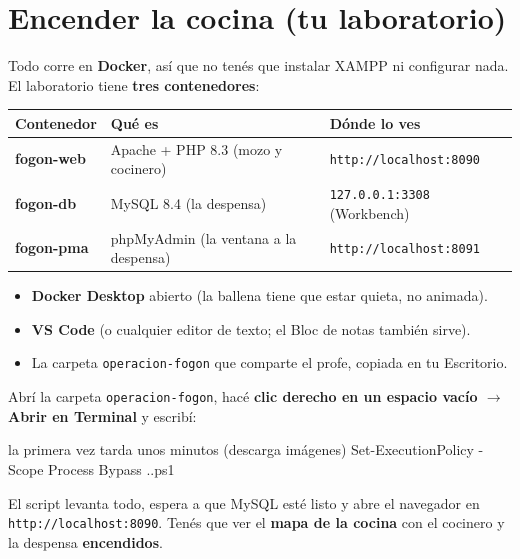 \clearpage
\renewcommand{\seccionactual}{ENCENDER LA COCINA}
\section*{Encender la cocina (tu laboratorio)}

Todo corre en \textbf{Docker}, así que no tenés que instalar XAMPP ni configurar nada.
El laboratorio tiene \textbf{tres contenedores}:

\renewcommand{\arraystretch}{1.3}
\begin{tabularx}{\linewidth}{>{\ttfamily\bfseries}l l X}
\toprule
\normalfont\bfseries Contenedor & \textbf{Qué es} & \textbf{Dónde lo ves} \\
\midrule
fogon-web & Apache + PHP 8.3 (mozo y cocinero) & \texttt{http://localhost:8090} \\
fogon-db  & MySQL 8.4 (la despensa) & \texttt{127.0.0.1:3308} (Workbench) \\
fogon-pma & phpMyAdmin (la ventana a la despensa) & \texttt{http://localhost:8091} \\
\bottomrule
\end{tabularx}

\begin{itemize}
  \item \textbf{Docker Desktop} abierto (la ballena tiene que estar quieta, no animada).
  \item \textbf{VS Code} (o cualquier editor de texto; el Bloc de notas también sirve).
  \item La carpeta \texttt{operacion-fogon} que comparte el profe, copiada en tu Escritorio.
\end{itemize}

Abrí la carpeta \texttt{operacion-fogon}, hacé \textbf{clic derecho en un espacio vacío $\rightarrow$ Abrir en Terminal} y escribí:
\begin{terminal}[PowerShell]{la primera vez tarda unos minutos (descarga imágenes)}
Set-ExecutionPolicy -Scope Process Bypass
.\scripts\iniciar.ps1
\end{terminal}
El script levanta todo, espera a que MySQL esté listo y abre el navegador en \texttt{http://localhost:8090}.
Tenés que ver el \textbf{mapa de la cocina} con el cocinero y la despensa \textbf{encendidos}.


